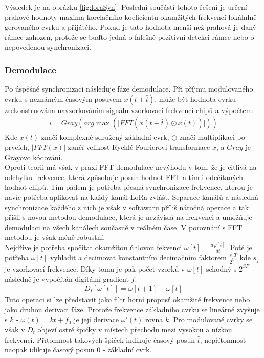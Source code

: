 \documentclass{ctuthesis}
\begin{document}
Výsledek je na obrázku \ref{fig:loraSyn}. Poslední součástí tohoto řešení je určení prahové hodnoty maxima korelačního koeficientu okamžitých frekvencí lokálnlně gerovaného cvrku a přijátého. Pokud je tato hodnota menší než prahová je daný rámec zahozen, protože se buďto jedná o falešně pozitivní detekci rámce nebo o nepovedenou synchronizaci.
\subsubsection{Demodulace}
\label{subsec:demodulace}
Po úspěšné synchronizaci následuje fáze demodulace. Při příjmu modulovaného cvrku s neznámým časovým posuvem $x(t + \hat{t})$, může být hodnota cvrku zrekonstruována navzorkováním signálu vzorkovací frekvencí chipů a výpočtem:
\begin{align}i= Gray(arg \max (\lvert FFT(x(t+ \hat{t}) \odot \overline{x(t)}) \rvert ))
\label{eq:lora2}
\end{align}
Kde $\overline{x(t)}$ značí komplexně sdružený základní cvrk, $\odot$ značí multiplikaci po prvcích, $\lvert FFT(x) \rvert$ zančí velikost Rychlé Fourierovi transformace $x$, a $Gray$ je Grayovo kódování. \\
Oproti teorii má však v praxi FFT demodulace nevýhodu v tom, že je citlivá na odchylku frekvence, která způsobuje posun hodnot FFT a tím i odečítaných hodnot chipů. Tím pádem je potřeba přesná synchronizace frekvence, kterou je navíc potřeba aplikovat na každý kanál LoRa zvlášť. Separace kanálů a následná synchronizace každého z nich je však v softawaru příliš náročná operace a tak \cite{gr-lora2018} přišli s novou metodou demodulace, která je nezávislá na frekvenci a umožňuje demodulaci na všech kanálech současně v reálném čase. V porovnání s FFT metodou je však méně robustní.\\
Nejdříve je potřeba spočítat okamžitou úhlovou fekvenci $\omega[t]=\frac{d\varphi[t]}{dt}$. Poté je potřeba $\omega[t]$ vyhladit a decimovat konstantním decimačním faktorem $\frac{s_fT}{2^{SF}}$ kde $s_f$ je vzorkovací frekvence. Díky tomu je pak počet vzorků v $\omega[t]$ schodný s $2^{SF}$ následně je vypočítán digitální gradient $f$:
\begin{align}
D_t[\omega[t]] = \omega[t+1]-\omega[t]
\label{eq:lora7}
\end{align}
Tuto operaci si lze představit jako filtr horní propusť okamžité frekvence nebo jako druhou derivaci fáze. Protože frekvence základního cvrku se lineárně zvyšuje s $k$ - $\omega(t) = kt + f_0$ je její derivace $\omega'(t)$ rovna $k$. Pro modulované cvrky se však v $D_t$ objeví ostré špičky v místech přechodu mezi vysokou a nízkou frekvencí. Přítomnost takových špiček indikuje časový posun $\hat{t}$, nepřítomnost naopak idikuje časový posun 0 - základní cvrk.\\
\end{document}
